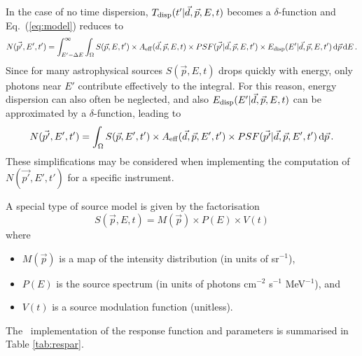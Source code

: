 \documentclass{article}[12pt,a4]
\begin{document}
In the case of no time dispersion, $T_{\rm disp}(t' | \vec{d}, \vec{p}, E, t)$ becomes a $\delta$-function
and Eq.~(\ref{eq:model}) reduces to 
\begin{equation}
N(\vec{p'}, E', t') = \int_{E'-\Delta E}^{\infty} \int_{\Omega} 
S(\vec{p}, E, t') \times A_{\rm eff}(\vec{d}, \vec{p}, E, t) \times
PSF(\vec{p'} | \vec{d}, \vec{p}, E, t') \times
E_{\rm disp}(E' | \vec{d}, \vec{p}, E, t') 
\, {\rm d}\vec{p} \, {\rm d}E \, .
\end{equation}
Since for many astrophysical sources $S(\vec{p}, E, t)$ drops quickly with energy, only
photons near $E'$ contribute effectively to the integral.
For this reason, energy dispersion can also often be neglected, and also
$E_{\rm disp}(E' | \vec{d}, \vec{p}, E, t)$ can be approximated by a $\delta$-function,
leading to
\begin{equation}
N(\vec{p'}, E', t') = \int_{\Omega} S(\vec{p}, E', t') \times A_{\rm eff}(\vec{d}, \vec{p}, E', t') \times
PSF(\vec{p'} | \vec{d}, \vec{p}, E', t') \, {\rm d}\vec{p} \, .
\end{equation}
These simplifications may be considered when implementing the computation of
$N(\vec{p'}, E', t')$ for a specific instrument.

A special type of source model is given by the factorisation
\begin{equation}
S(\vec{p}, E, t) = M(\vec{p}) \times P(E) \times V(t)
\end{equation}
where
\begin{itemize}
\item[] $M(\vec{p})$ is a map of the intensity distribution (in units of sr$^{-1}$),
\item[] $P(E)$ is the source spectrum (in units of photons cm$^{-2}$ s$^{-1}$ MeV$^{-1}$), and
\item[] $V(t)$ is a source modulation function (unitless).
\end{itemize}

The \this\ implementation of the response function and parameters is summarised in 
Table \ref{tab:respar}.
\end{document}
